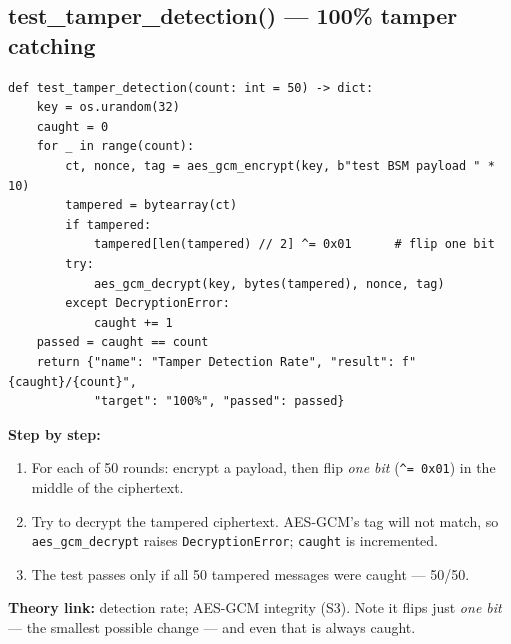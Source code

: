 \documentclass[11pt,a4paper]{article}
\begin{document}
\subsection{test\_tamper\_detection() --- 100\% tamper catching}
\begin{lstlisting}[style=py,caption={evaluate\_security.py --- the tamper detection test.}]
def test_tamper_detection(count: int = 50) -> dict:
    key = os.urandom(32)
    caught = 0
    for _ in range(count):
        ct, nonce, tag = aes_gcm_encrypt(key, b"test BSM payload " * 10)
        tampered = bytearray(ct)
        if tampered:
            tampered[len(tampered) // 2] ^= 0x01      # flip one bit
        try:
            aes_gcm_decrypt(key, bytes(tampered), nonce, tag)
        except DecryptionError:
            caught += 1
    passed = caught == count
    return {"name": "Tamper Detection Rate", "result": f"{caught}/{count}",
            "target": "100%", "passed": passed}
\end{lstlisting}
\textbf{Step by step:}
\begin{enumerate}
  \item For each of 50 rounds: encrypt a payload, then flip \emph{one bit}
        (\texttt{\^{}= 0x01}) in the middle of the ciphertext.
  \item Try to decrypt the tampered ciphertext. AES-GCM's tag will not match, so
        \texttt{aes\_gcm\_decrypt} raises \texttt{DecryptionError};
        \texttt{caught} is incremented.
  \item The test passes only if all 50 tampered messages were caught --- 50/50.
\end{enumerate}
\textbf{Theory link:} detection rate; AES-GCM integrity (S3). Note it flips just
\emph{one bit} --- the smallest possible change --- and even that is always
caught.
\end{document}
